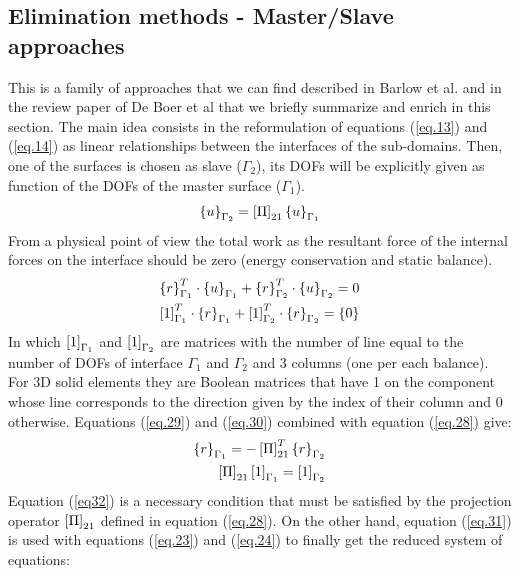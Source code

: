   \subsection{Elimination methods - Master/Slave  approaches}\label{ssec33}
  This is a family of approaches that we can find described in Barlow et al. \cite{barlow1982constraint} and in the review paper of De Boer et al \cite{de2007review} that we briefly summarize and enrich in this section. The main idea consists in the reformulation of equations (\ref{eq.13}) and (\ref{eq.14}) as linear relationships between the interfaces of the sub-domains. Then, one of the surfaces is chosen as slave ($\Gamma_2$), its DOFs will be explicitly given as function of the DOFs of the master surface ($\Gamma_1$).  
  \begin{equation}
  \label{eq.28}
  \left\lbrace{u}\right \rbrace_{\Gamma_2}=\left[{\Pi}\right]_{21}\left\lbrace{u}\right \rbrace_{\Gamma_1}
  \end{equation}
  From a physical point of view the total work as the resultant force  of the internal forces on the interface should be zero (energy conservation and static balance).
  \begin{eqnarray}
  \label{eq.29}
  \left\lbrace{r}\right \rbrace_{\Gamma_1}^T\cdot\left\lbrace{u}\right \rbrace_{\Gamma_1}+\left\lbrace{r}\right \rbrace_{\Gamma_2}^T\cdot\left\lbrace{u}\right \rbrace_{\Gamma_2}=0\\
  \label{eq.30}
  \left[{1}\right]_{\Gamma_1}^T\cdot\left\lbrace{r}\right \rbrace_{\Gamma_1}+\left[{1}\right]_{\Gamma_2}^T\cdot\left\lbrace{r}\right \rbrace_{\Gamma_2}=\left\lbrace{0}\right \rbrace
  \end{eqnarray}
  In which $\left[{1}\right]_{\Gamma_1}$ and $\left[{1}\right]_{\Gamma_2}$ are matrices with the number of line equal to the number of DOFs of interface ${\Gamma_1}$ and ${\Gamma_2}$ and 3 columns (one per each balance). For 3D solid elements they are Boolean matrices that have 1 on the component whose line corresponds to the direction given by the index of their column and 0 otherwise. 
   Equations (\ref{eq.29}) and (\ref{eq.30}) combined with equation (\ref{eq.28}) give:
  \begin{eqnarray}
  \label{eq.31}
  \left\lbrace{r}\right \rbrace_{\Gamma_1}=-\left[{\Pi}\right]_{21}^T\left\lbrace{r}\right \rbrace_{\Gamma_2}\\
  \label{eq32}
  \left[{\Pi}\right]_{21}\left[{1}\right]_{\Gamma_1}=\left[{1}\right]_{\Gamma_2}
  \end{eqnarray}
  Equation (\ref{eq32}) is a necessary condition that must be satisfied by the projection operator $\left[{\Pi}\right]_{21}$ defined in equation (\ref{eq.28}). On the other hand, equation (\ref{eq.31}) is used with equations (\ref{eq.23}) and (\ref{eq.24}) to finally get the reduced system of equations:
